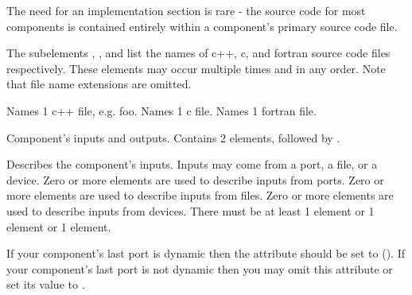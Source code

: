 \documentclass[11pt]{article}
\begin{document}
\begin{description}
\begin{description}
    The need for an implementation section is rare - the source code for
    most components is contained entirely within a component's primary 
    source code file.
    
    The subelements , , and 
    list the names of c++, c, and fortran source code files respectively.
    These elements may occur multiple times and in any order.
    Note that file name extensions are omitted.
    \begin{description}
       Names 1 c++ file,
      e.g. foo. 
       Names 1 c file.
       Names 1 fortran file.
    \end{description}
     Component's inputs and
    outputs.  Contains 2 elements,  followed by
    .
    \begin{description}
       Describes the
      component's inputs. Inputs may 
      come from a port, a file, or a device.  Zero or more 
      elements are used to describe inputs from ports.  Zero or more
       elements are used to describe inputs from files.  Zero
      or more  elements are used to describe inputs from
      devices.  There must be at least 1  element or 1
       element or 1  element.

      If your component's last port is dynamic then the
       attribute should be set to 
      ().  If your component's last port
      is not dynamic then you may omit this attribute or set its value to
      .


\end{description}
\end{description}
\end{description}
\end{document}
